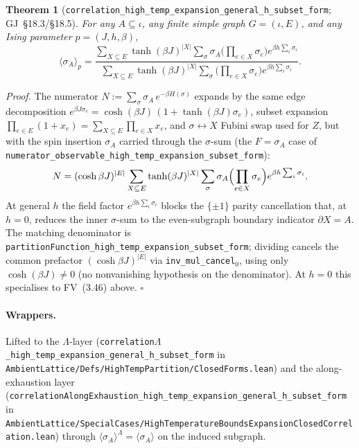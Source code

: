 \documentclass[a4paper,11pt]{article}
\newtheorem{theorem}{Theorem}
\newcommand{\LeanLambda}{\texorpdfstring{\ensuremath{\Lambda}}{Lambda}}
\begin{document}
\begin{theorem}[\texttt{correlation\_high\_temp\_expansion\_general\_h\_subset\_form}; GJ~\S18.3/\S18.5]
For any $A \subseteq \iota$, any finite simple graph $G = (\iota, E)$, and
any Ising parameter $p = (J, h, \beta)$,
\[
\langle \sigma_A \rangle_p =
  \frac{\sum_{X \subseteq E} \tanh(\beta J)^{|X|}
        \sum_\sigma \sigma_A \bigl(\prod_{e \in X} \sigma_e\bigr)
          e^{\beta h \sum_i \sigma_i}}
       {\sum_{X \subseteq E} \tanh(\beta J)^{|X|}
        \sum_\sigma \bigl(\prod_{e \in X} \sigma_e\bigr)
          e^{\beta h \sum_i \sigma_i}}.
\]
\end{theorem}

\textit{Proof.} The numerator
$N := \sum_\sigma \sigma_A\, e^{-\beta H(\sigma)}$ expands by the same edge
decomposition $e^{\beta J \sigma_e} = \cosh(\beta J)\,(1 + \tanh(\beta J)\sigma_e)$,
subset expansion $\prod_{e \in E}(1 + x_e) = \sum_{X \subseteq E} \prod_{e \in X} x_e$,
and $\sigma \leftrightarrow X$ Fubini swap used for $Z$, but with the spin
insertion $\sigma_A$ carried through the $\sigma$-sum (the
$F = \sigma_A$ case of
\texttt{numerator\_observable\_high\_temp\_expansion\_subset\_form}):
\[
N = (\cosh \beta J)^{|E|}
   \sum_{X \subseteq E} \tanh(\beta J)^{|X|}
   \sum_\sigma \sigma_A \Bigl(\prod_{e \in X} \sigma_e\Bigr) e^{\beta h \sum_i \sigma_i}.
\]
At general $h$ the field factor $e^{\beta h \sum_i \sigma_i}$ blocks the
$\{\pm 1\}$ parity cancellation that, at $h = 0$, reduces the inner
$\sigma$-sum to the even-subgraph boundary indicator $\partial X = A$.
The matching denominator is
\texttt{partitionFunction\_high\_temp\_expansion\_subset\_form}; dividing
cancels the common prefactor $(\cosh \beta J)^{|E|}$ via
\texttt{inv\_mul\_cancel}$_0$, using only $\cosh(\beta J) \neq 0$ (no
nonvanishing hypothesis on the denominator). At $h = 0$ this specialises to
FV~(3.46) above.
\hfill$\square$

\paragraph{Wrappers.} Lifted to the \(\Lambda\)-layer
(\texttt{correlation\LeanLambda\_high\_temp\_expansion\_general\_h\_subset\_form}
in \texttt{AmbientLattice/Defs/HighTempPartition/ClosedForms.lean}) and the
along-exhaustion layer
(\texttt{correlationAlongExhaustion\_high\_temp\_expansion\_general\_h\_subset\_form}
in \texttt{AmbientLattice/SpecialCases/HighTemperatureBoundsExpansionClosedCorrelation.lean})
through \(\langle\sigma_A\rangle^\Lambda = \langle\sigma_A\rangle\) on the
induced subgraph.
\end{document}
